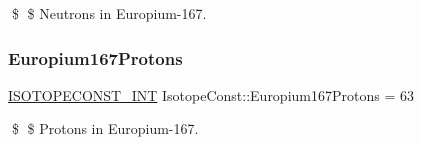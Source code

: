 \$ \$ Neutrons in Europium-\/167. \mbox{\label{group___isotope_const-_europium-_eu167_gafe79ea41381b7264436957e98dbc9bec}} 
\subsubsection{\texorpdfstring{Europium167\+Protons}{Europium167Protons}}
{\footnotesize\ttfamily \mbox{\hyperlink{group___isotope_const-_macros_ga5f18360b3e99483a35c32d789e62621c}{I\+S\+O\+T\+O\+P\+E\+C\+O\+N\+S\+T\+\_\+\+I\+NT}} Isotope\+Const\+::\+Europium167\+Protons = 63}

\$ \$ Protons in Europium-\/167. 